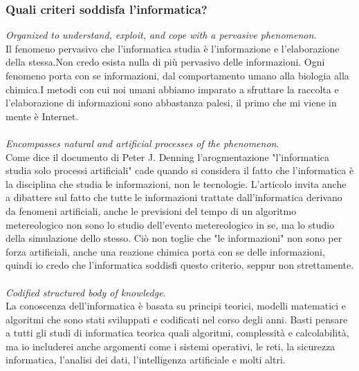 \documentclass[a4paper]{article}
\begin{document}
\subsubsection{Quali criteri soddisfa l'informatica?}
\emph{Organized to understand, exploit, and cope with a pervasive phenomenon.}\\
Il fenomeno pervasivo che l'informatica studia è l'informazione e l'elaborazione della stessa.Non credo esista nulla di più pervasivo delle informazioni. Ogni fenomeno porta con se informazioni, dal comportamento umano alla biologia alla chimica.I metodi con cui noi umani abbiamo imparato a sfruttare la raccolta e l'elaborazione di informazioni sono abbastanza palesi, il primo che mi viene in mente è Internet.
\\\\

\emph{Encompasses natural and artificial processes of the phenomenon}.\\
Come dice il documento di Peter J. Denning\cite{isScience} l'arogmentazione "l'informatica studia solo processi artificiali" cade quando si considera il fatto che l'informatica è la disciplina che studia le informazioni, non le tecnologie.
L'articolo \cite{isScience}invita anche a dibattere sul fatto che tutte le informazioni trattate dall'informatica derivano da fenomeni artificiali, anche le previsioni del tempo di un algoritmo metereologico non sono lo studio dell'evento metereologico in se, ma lo studio della simulazione dello stesso. Ciò non toglie che "le informazioni" non sono per forza artificiali, anche una reazione chimica porta con se delle informazioni, quindi io credo che l'informatica soddisfi questo criterio, seppur non strettamente.\\ \\

\emph{Codified structured body of knowledge}.\\La conoscenza dell'informatica è basata su principi teorici, modelli matematici e algoritmi che sono stati sviluppati e codificati nel corso degli anni. Basti pensare a tutti gli studi di informatica teorica quali algoritmi, complessità e calcolabilità, ma io includerei anche argomenti come i sistemi operativi, le reti, la sicurezza informatica, l'analisi dei dati, l'intelligenza artificiale e molti altri. \\\\
\end{document}

